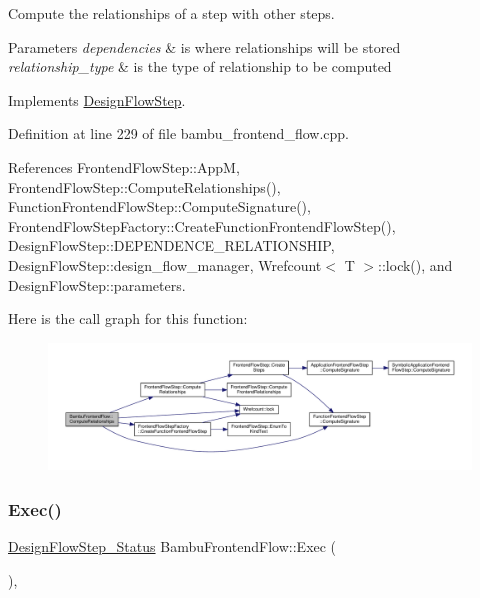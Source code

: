 Compute the relationships of a step with other steps. 


\begin{DoxyParams}{Parameters}
{\em dependencies} & is where relationships will be stored \\
\hline
{\em relationship\+\_\+type} & is the type of relationship to be computed \\
\hline
\end{DoxyParams}


Implements \hyperlink{classDesignFlowStep_a65bf7bcb603189a7ddcf930c3a9fd7fe}{Design\+Flow\+Step}.



Definition at line 229 of file bambu\+\_\+frontend\+\_\+flow.\+cpp.



References Frontend\+Flow\+Step\+::\+AppM, Frontend\+Flow\+Step\+::\+Compute\+Relationships(), Function\+Frontend\+Flow\+Step\+::\+Compute\+Signature(), Frontend\+Flow\+Step\+Factory\+::\+Create\+Function\+Frontend\+Flow\+Step(), Design\+Flow\+Step\+::\+D\+E\+P\+E\+N\+D\+E\+N\+C\+E\+\_\+\+R\+E\+L\+A\+T\+I\+O\+N\+S\+H\+IP, Design\+Flow\+Step\+::design\+\_\+flow\+\_\+manager, Wrefcount$<$ T $>$\+::lock(), and Design\+Flow\+Step\+::parameters.

Here is the call graph for this function\+:
\nopagebreak
\begin{figure}[H]
\begin{center}
\leavevmode
\includegraphics[width=350pt]{d8/d88/classBambuFrontendFlow_a17a62b2f18ad3df23ec7a5418059c465_cgraph}
\end{center}
\end{figure}
\mbox{\label{classBambuFrontendFlow_a12e11602383ea4902d93e20f2400eed3}} 
\subsubsection{\texorpdfstring{Exec()}{Exec()}}
{\footnotesize\ttfamily \hyperlink{design__flow__step_8hpp_afb1f0d73069c26076b8d31dbc8ebecdf}{Design\+Flow\+Step\+\_\+\+Status} Bambu\+Frontend\+Flow\+::\+Exec (\begin{DoxyParamCaption}{ }\end{DoxyParamCaption})\hspace{0.3cm}{\ttfamily [override]}, {\ttfamily [virtual]}}



